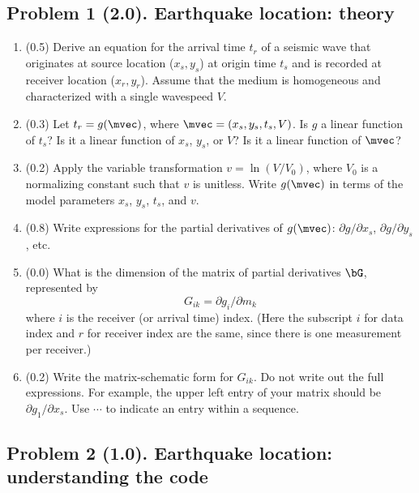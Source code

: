 \documentclass[11pt,titlepage,fleqn]{article}
\begin{document}

\subsection*{Problem 1 (2.0). Earthquake location: theory}

\begin{enumerate}
\item (0.5) Derive an equation for the arrival time $t_r$ of a seismic wave that originates at source location ($x_s, y_s$) at origin time $t_s$ and is recorded at receiver location ($x_r, y_r$). Assume that the medium is homogeneous and characterized with a single wavespeed $V$.

\item (0.3) Let $t_r = g(\mvec)$, where $\mvec = (x_s,y_s,t_s,V)$.
Is $g$ a linear function of $t_s$? Is it a linear function of $x_s$, $y_s$, or $V$?
Is it a linear function of $\mvec$?

\item (0.2) Apply the variable transformation $v = \ln(V/V_0)$, where $V_0$ is a normalizing constant such that $v$ is unitless. Write $g(\mvec)$ in terms of the model parameters $x_s$, $y_s$, $t_s$, and $v$.

\item (0.8) Write expressions for the partial derivatives of $g(\mvec)$: $\partial g/ \partial x_s$, $\partial g/ \partial y_s$, etc.

\item (0.0) What is the dimension of the matrix of partial derivatives $\bG$, represented by
%
\begin{equation}
G_{ik} = \partial g_i/ \partial m_k
\end{equation}
%
where $i$ is the receiver (or arrival time) index. (Here the subscript $i$ for data index and $r$ for receiver index are the same, since there is one measurement per receiver.)

\item (0.2) Write the matrix-schematic form for $G_{ik}$. Do not write out the full expressions.
For example, the upper left entry of your matrix should be $\partial g_1/\partial x_s$.
Use $\cdots$ to indicate an entry within a sequence.

\end{enumerate}


\subsection*{Problem 2 (1.0). Earthquake location: understanding the code}
\end{document}
